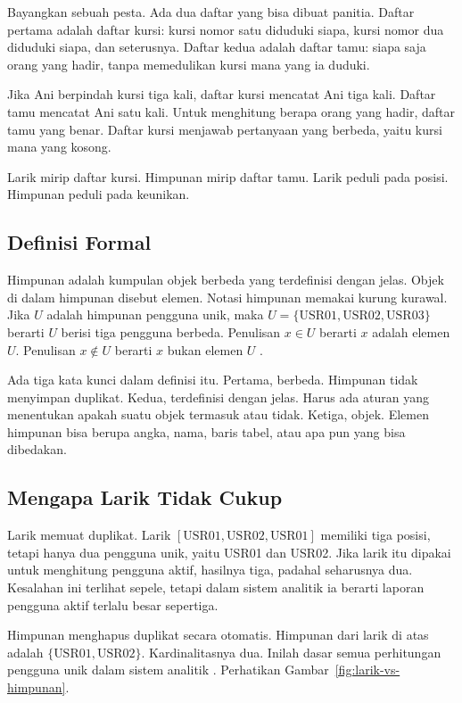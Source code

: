\documentclass[11pt,a4paper]{article}
\begin{document}
Bayangkan sebuah pesta. Ada dua daftar yang bisa dibuat panitia. Daftar pertama adalah daftar kursi: kursi nomor satu diduduki siapa, kursi nomor dua diduduki siapa, dan seterusnya. Daftar kedua adalah daftar tamu: siapa saja orang yang hadir, tanpa memedulikan kursi mana yang ia duduki.

Jika Ani berpindah kursi tiga kali, daftar kursi mencatat Ani tiga kali. Daftar tamu mencatat Ani satu kali. Untuk menghitung berapa orang yang hadir, daftar tamu yang benar. Daftar kursi menjawab pertanyaan yang berbeda, yaitu kursi mana yang kosong.

Larik mirip daftar kursi. Himpunan mirip daftar tamu. Larik peduli pada posisi. Himpunan peduli pada keunikan.

\subsection{Definisi Formal}

Himpunan adalah kumpulan objek berbeda yang terdefinisi dengan jelas. Objek di dalam himpunan disebut elemen. Notasi himpunan memakai kurung kurawal. Jika $U$ adalah himpunan pengguna unik, maka $U=\{\text{USR01},\text{USR02},\text{USR03}\}$ berarti $U$ berisi tiga pengguna berbeda. Penulisan $x \in U$ berarti $x$ adalah elemen $U$. Penulisan $x \notin U$ berarti $x$ bukan elemen $U$ \cite{rosen}.

Ada tiga kata kunci dalam definisi itu. Pertama, berbeda. Himpunan tidak menyimpan duplikat. Kedua, terdefinisi dengan jelas. Harus ada aturan yang menentukan apakah suatu objek termasuk atau tidak. Ketiga, objek. Elemen himpunan bisa berupa angka, nama, baris tabel, atau apa pun yang bisa dibedakan.

\subsection{Mengapa Larik Tidak Cukup}

Larik memuat duplikat. Larik $[\text{USR01},\text{USR02},\text{USR01}]$ memiliki tiga posisi, tetapi hanya dua pengguna unik, yaitu USR01 dan USR02. Jika larik itu dipakai untuk menghitung pengguna aktif, hasilnya tiga, padahal seharusnya dua. Kesalahan ini terlihat sepele, tetapi dalam sistem analitik ia berarti laporan pengguna aktif terlalu besar sepertiga.

Himpunan menghapus duplikat secara otomatis. Himpunan dari larik di atas adalah $\{\text{USR01},\text{USR02}\}$. Kardinalitasnya dua. Inilah dasar semua perhitungan pengguna unik dalam sistem analitik \cite{epp}. Perhatikan Gambar~\ref{fig:larik-vs-himpunan}.
\end{document}
